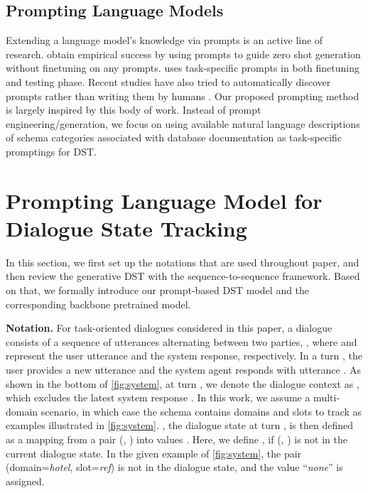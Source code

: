 \documentclass[11pt]{article}
\begin{document}
\subsection{Prompting Language Models}
Extending a language model’s knowledge via prompts is an active line of research. \citet{radford2019language} obtain empirical success by using prompts to guide zero shot generation without finetuning on any prompts. \citet{raffel2020exploring} uses task-specific prompts in both finetuning and testing phase. Recent studies have also tried to automatically discover prompts rather than writing them by humans \cite{jiang2020can}. Our proposed prompting method is largely inspired by this body of work. Instead of prompt engineering/generation, we focus on using available natural language descriptions of schema categories associated with database documentation as task-specific promptings for DST.





 

\section{Prompting Language Model for Dialogue State Tracking}
In this section, we first set up the notations that are used throughout paper, and then review the generative DST with the sequence-to-sequence framework.
Based on that, we formally introduce our prompt-based DST model and the corresponding backbone pretrained model.

\noindent
\textbf{Notation.}
For task-oriented dialogues considered in this paper,
a dialogue consists of a sequence of utterances alternating between two parties, ,
where  and  represent the user utterance and the system response, respectively.
In a turn , the user provides a new utterance \textit{} and the system agent responds with utterance \textit{}.
As shown in the bottom of \autoref{fig:system}, at turn , we denote the dialogue context as , which excludes the latest system response .
In this work, we assume a multi-domain scenario, in which case the schema contains  domains  and
 slots  to track as examples illustrated in \autoref{fig:system}.
, the dialogue state at turn , is then defined as a mapping from a pair (, ) into values .
Here, we define , if (, ) is not in the current dialogue state.
In the given example of \autoref{fig:system}, the pair (domain=\textit{hotel}, slot=\textit{ref}) is not in the dialogue state, and the value ``\textit{none}'' is assigned.
\end{document}
